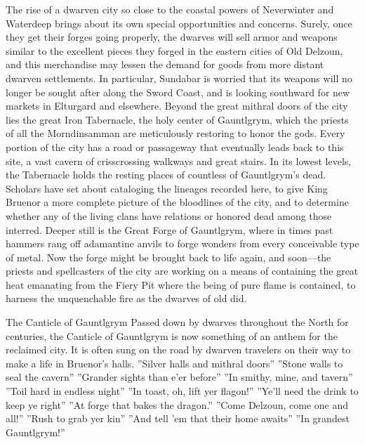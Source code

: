\documentclass[10pt,a4paper,twoside,twocolumn,openany,bg=print,nodeprecatedcode]{dndbook}
\begin{document}
The rise of a dwarven city so close to the coastal powers of Neverwinter and Waterdeep brings about its own special opportunities and concerns. Surely, once they get their forges going properly, the dwarves will sell armor and weapons similar to the excellent pieces they forged in the eastern cities of Old Delzoun, and this merchandise may lessen the demand for goods from more distant dwarven settlements. In particular, Sundabar is worried that its weapons will no longer be sought after along the Sword Coast, and is looking southward for new markets in Elturgard and elsewhere.
Beyond the great mithral doors of the city lies the great Iron Tabernacle, the holy center of Gauntlgrym, which the priests of all the Morndinsamman are meticulously restoring to honor the gods. Every portion of the city has a road or passageway that eventually leads back to this site, a vast cavern of crisscrossing walkways and great stairs. In its lowest levels, the Tabernacle holds the resting places of countless of Gauntlgrym's dead. Scholars have set about cataloging the lineages recorded here, to give King Bruenor a more complete picture of the bloodlines of the city, and to determine whether any of the living clans have relations or honored dead among those interred.
Deeper still is the Great Forge of Gauntlgrym, where in times past hammers rang off adamantine anvils to forge wonders from every conceivable type of metal. Now the forge might be brought back to life again, and soon—the priests and spellcasters of the city are working on a means of containing the great heat emanating from the Fiery Pit where the being of pure flame is contained, to harness the unquenchable fire as the dwarves of old did.
\begin{DndComment}{The Canticle of Gauntlgrym}
Passed down by dwarves throughout the North for centuries, the Canticle of Gauntlgrym is now something of an anthem for the reclaimed city. It is often sung on the road by dwarven travelers on their way to make a life in Bruenor's halls.
\DndQuote%
{}
{''Silver halls and mithral doors''}
{''Stone walls to seal the cavern''}
{''Grander sights than e'er before''}
{''In smithy, mine, and tavern''}
{''Toil hard in endless night''}
{''In toast, oh, lift yer flagon!''}
{''Ye'll need the drink to keep ye right''}
{''At forge that bakes the dragon.''}
{''Come Delzoun, come one and all!''}
{''Rush to grab yer kin''}
{''And tell 'em that their home awaits''}
{''In grandest Gauntlgrym!''}
{}
\end{DndComment}
\end{document}
